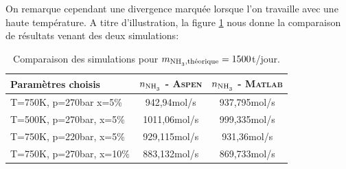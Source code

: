 On remarque cependant une divergence marquée lorsque l'on travaille 
avec une haute température. A titre d'illustration, 
la figure \ref{tab:sim} nous donne la comparaison 
de résultats venant des deux simulations:

\begin{table}[h!]
	\centering
	\begin{tabular}{l|c|c}
		Paramètres choisis & $n_{\ce{NH3}}$ - \textsc{Aspen} & $n_{\ce{NH3}}$ - \textsc{Matlab}\\
		\hline
		 T=750K, p=270bar  x=5\% & 942,94mol/s & 937,795mol/s \\

		\hline\hline

		T=500K, p=270bar, x=5\% & 1011,06mol/s & 999,335mol/s \\

		\hline\hline

		T=750K, p=220bar, x=5\% & 929,115mol/s & 931,36mol/s \\
		
		\hline\hline
		
		T=750K, p=270bar, x=10\% & 883,132mol/s & 869,733mol/s \\
		\hline
	\end{tabular}
	\caption{Comparaison des simulations pour $m_{\ce{NH3}, \text{théorique}}=1500$t/jour.}
	\label{tab:sim}
\end{table}


